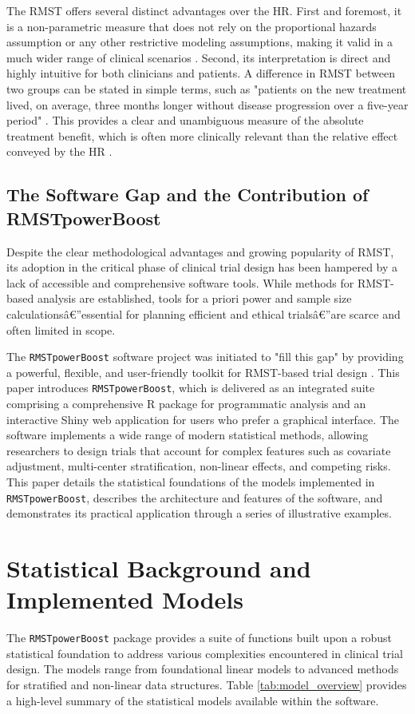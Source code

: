 \documentclass[article]{jss}
\begin{document}
The RMST offers several distinct advantages over the HR. First and foremost, it is a non-parametric measure that does not rely on the proportional hazards assumption or any other restrictive modeling assumptions, making it valid in a much wider range of clinical scenarios \cite{[1]}. Second, its interpretation is direct and highly intuitive for both clinicians and patients. A difference in RMST between two groups can be stated in simple terms, such as "patients on the new treatment lived, on average, three months longer without disease progression over a five-year period" \cite{[1]}. This provides a clear and unambiguous measure of the absolute treatment benefit, which is often more clinically relevant than the relative effect conveyed by the HR \cite{[1]}.

\subsection{The Software Gap and the Contribution of RMSTpowerBoost}
Despite the clear methodological advantages and growing popularity of RMST, its adoption in the critical phase of clinical trial design has been hampered by a lack of accessible and comprehensive software tools. While methods for RMST-based analysis are established, tools for a priori power and sample size calculationsâ€”essential for planning efficient and ethical trialsâ€”are scarce and often limited in scope.

The \texttt{RMSTpowerBoost} software project was initiated to "fill this gap" by providing a powerful, flexible, and user-friendly toolkit for RMST-based trial design \cite{[1]}. This paper introduces \texttt{RMSTpowerBoost}, which is delivered as an integrated suite comprising a comprehensive R package for programmatic analysis and an interactive Shiny web application for users who prefer a graphical interface. The software implements a wide range of modern statistical methods, allowing researchers to design trials that account for complex features such as covariate adjustment, multi-center stratification, non-linear effects, and competing risks. This paper details the statistical foundations of the models implemented in \texttt{RMSTpowerBoost}, describes the architecture and features of the software, and demonstrates its practical application through a series of illustrative examples.

\section{Statistical Background and Implemented Models}
The \texttt{RMSTpowerBoost} package provides a suite of functions built upon a robust statistical foundation to address various complexities encountered in clinical trial design. The models range from foundational linear models to advanced methods for stratified and non-linear data structures. Table \ref{tab:model_overview} provides a high-level summary of the statistical models available within the software.
\end{document}
